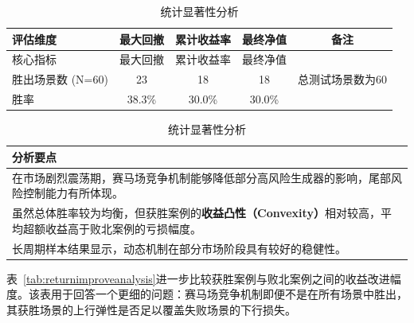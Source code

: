 \begin{table}[!htbp]
\centering
\caption{赛马场竞争机制 与基准模型综合性能对比矩阵}
\label{tab:RTVSaselineSideways}
\small
\setlength{\tabcolsep}{4pt}

\begin{subtable}{\textwidth}
\centering
\caption{定量指标对比}
\begin{tabular}{lcccc}
\toprule
\textbf{评估维度} & \textbf{最大回撤} & \textbf{累计收益率} & \textbf{最终净值} & \textbf{备注} \\
\midrule
核心指标 & 最大回撤 & 累计收益率 & 最终净值 &  \\
胜出场景数 (N=60) & 23 & 18 & 18 & 总测试场景数为60 \\
胜率 & 38.3\% & 30.0\% & 30.0\% &  \\
\bottomrule
\end{tabular}
\end{subtable}
\vspace{0.3cm}

\begin{subtable}{\textwidth}
\centering
\caption{统计显著性分析}
\begin{tabular}{p{\textwidth}}
\toprule
\textbf{分析要点} \\
\midrule
在市场剧烈震荡期，赛马场竞争机制能够降低部分高风险生成器的影响，尾部风险控制能力有所体现。 \\
\addlinespace[5pt]
虽然总体胜率较为均衡，但获胜案例的\textbf{收益凸性（Convexity）}相对较高，平均超额收益高于败北案例的亏损幅度。 \\
\addlinespace[5pt]
长周期样本结果显示，动态机制在部分市场阶段具有较好的稳健性。 \\
\bottomrule
\end{tabular}
\end{subtable}

\end{table}

表~\ref{tab:returnimproveanalysis}进一步比较获胜案例与败北案例之间的收益改进幅度。该表用于回答一个更细的问题：赛马场竞争机制即便不是在所有场景中胜出，其获胜场景的上行弹性是否足以覆盖失败场景的下行损失。


